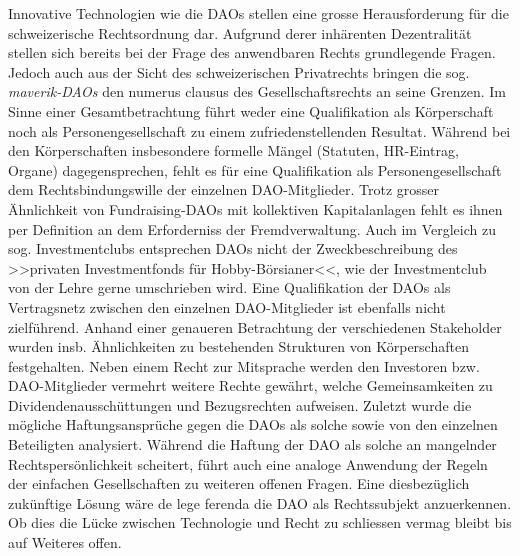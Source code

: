 \documentclass[a4paper,12pt]{report}
\begin{document}
	Innovative Technologien wie die DAOs stellen eine grosse Herausforderung für die schweizerische Rechtsordnung dar. Aufgrund derer inhärenten Dezentralität stellen sich bereits bei der Frage des anwendbaren Rechts grundlegende Fragen. Jedoch auch aus der Sicht des schweizerischen Privatrechts bringen die sog. \textit{maverik-DAOs} den numerus clausus des Gesellschaftsrechts an seine Grenzen. Im Sinne einer Gesamtbetrachtung führt weder eine Qualifikation als Körperschaft noch als Personengesellschaft zu einem zufriedenstellenden Resultat. Während bei den Körperschaften insbesondere formelle Mängel (Statuten, HR-Eintrag, Organe) dagegensprechen, fehlt es für eine Qualifikation als Personengesellschaft dem Rechtsbindungswille der einzelnen DAO-Mitglieder. Trotz grosser Ähnlichkeit von Fundraising-DAOs mit kollektiven Kapitalanlagen fehlt es ihnen per Definition an dem Erforderniss der Fremdverwaltung. Auch im Vergleich zu sog. Investmentclubs entsprechen DAOs nicht der Zweckbeschreibung des >>privaten Investmentfonds für Hobby-Börsianer<<, wie der Investmentclub von der Lehre gerne umschrieben wird. Eine Qualifikation der DAOs als Vertragsnetz zwischen den einzelnen DAO-Mitglieder ist ebenfalls nicht zielführend. Anhand einer genaueren Betrachtung der verschiedenen Stakeholder wurden insb. Ähnlichkeiten zu bestehenden Strukturen von Körperschaften festgehalten. Neben einem Recht zur Mitsprache werden den Investoren bzw. DAO-Mitglieder vermehrt weitere Rechte gewährt, welche Gemeinsamkeiten zu Dividendenausschüttungen und Bezugsrechten aufweisen. Zuletzt wurde die mögliche Haftungsansprüche gegen die  DAOs als solche sowie von den einzelnen Beteiligten analysiert. Während die Haftung der DAO als solche an mangelnder Rechtspersönlichkeit scheitert, führt auch eine analoge Anwendung der Regeln der einfachen Gesellschaften zu weiteren offenen Fragen. Eine diesbezüglich zukünftige Lösung wäre de lege ferenda die DAO als Rechtssubjekt anzuerkennen. Ob dies die Lücke zwischen Technologie und Recht zu schliessen vermag bleibt bis auf Weiteres offen.
	
	\revertgeometry
	\printbibliography[keyword={computerscience}, title=Bibliography]
	
	\newpage
\end{document}
